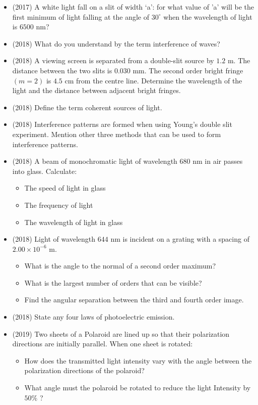 \documentclass{article}
\begin{document}
\begin{itemize}
\item (2017)  A white light fall on a slit of width ‘a’: for what value of 'a' will be the first minimum of light falling at the angle of $ 30^{\circ}$ when the wavelength of light is $ 6500$ nm? 
\item (2018)  What do you understand by the term interference of waves?
\item (2018)  A viewing screen is separated from a double-slit source by $ 1.2$ m. The distance between the two slits is $ 0.030$ mm. The second order bright fringe $ (m=2)$ is $ 4.5$ cm from the centre line. Determine the wavelength of the light and the distance between adjacent bright fringes. 
\item (2018)  Define the term coherent sources of light. 
\item (2018)  Interference patterns are formed when using Young’s double slit experiment. Mention other three methods that can be used to form interference patterns. 
\item (2018)  A beam of monochromatic light of wavelength $ 680$ nm in air passes into glass.  Calculate: 
 \begin{itemize}
\item The speed of light in glass
\item The frequency of light
\item The wavelength of light in glass
\end{itemize}
\item (2018)  Light of wavelength $ 644$ nm is incident on a grating with a spacing of $ 2.00 \times 10^{-6}$ m. 
 \begin{itemize}
\item What is the angle to the normal of a second order maximum? 
\item What is the largest number of orders that can be visible? 
\item Find the angular separation between the third and fourth order image.
\end{itemize}
\item (2018)  State any four laws of photoelectric emission. 
\item (2019)  Two sheets of a Polaroid are lined up so that their polarization directions are initially parallel. When one sheet is rotated:
 \begin{itemize}
\item How does the transmitted light intensity vary with the angle between the polarization directions of the polaroid? 
\item What angle must the polaroid be rotated to reduce the light Intensity by $ 50\%$ ?

\end{itemize}
\end{itemize}
\end{document}
